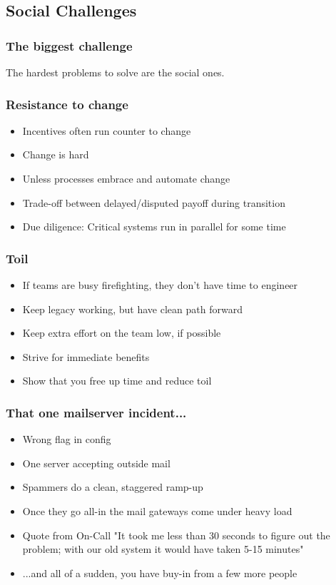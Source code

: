 \documentclass[t]{beamer}
\begin{document}
\subsection{Social Challenges}

\begin{frame}
	\frametitle{The biggest challenge}
		\begin{center}
			\vfill
			The hardest problems to solve are the social ones.
			\vfill
		\end{center}
\end{frame}

\begin{frame}
	\frametitle{Resistance to change}
	\begin{itemize}
		\item Incentives often run counter to change
		\item Change is hard
		\item Unless processes embrace and automate change
		\item Trade-off between delayed/disputed payoff during transition
		\item Due diligence: Critical systems run in parallel for some time
	\end{itemize}
\end{frame}

\begin{frame}
	\frametitle{Toil}
	\begin{itemize}
		\item If teams are busy firefighting, they don't have time to engineer
		\item Keep legacy working, but have clean path forward
		\item Keep extra effort on the team low, if possible
		\item Strive for immediate benefits
		\item Show that you free up time and reduce toil
	\end{itemize}
\end{frame}

\begin{frame}
	\frametitle{That one mailserver incident...}
	\begin{itemize}
		\item Wrong flag in config
		\item One server accepting outside mail
		\item Spammers do a clean, staggered ramp-up
		\item Once they go all-in the mail gateways come under heavy load
		\item Quote from On-Call "It took me less than 30 seconds to figure out the problem; with our old system it would have taken 5-15 minutes"
		\item ...and all of a sudden, you have buy-in from a few more people
	\end{itemize}
\end{frame}
\end{document}
